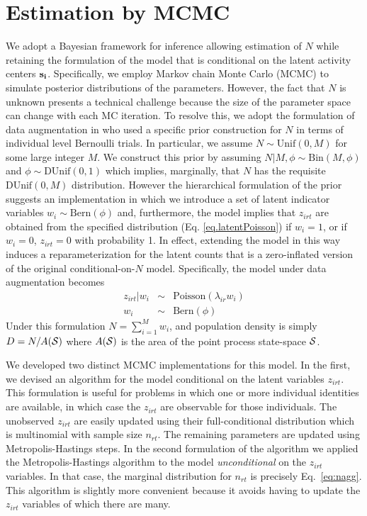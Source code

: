 \section{Estimation by MCMC}
\label{s:mcmc}

We adopt a Bayesian framework for inference allowing estimation of $N$
while retaining the formulation of the model that is conditional on
the latent activity centers $\bf s_i$.
Specifically, we employ Markov chain Monte Carlo
(MCMC) to simulate posterior distributions of the parameters. However,
the fact that $N$ is unknown presents a
technical challenge because the size of the parameter space can change
with each MC iteration. To resolve this, we
adopt the formulation of data augmentation in \citet{royle_etal:2007} who
used a specific prior construction for $N$ in terms of individual level
Bernoulli trials. In particular, we assume $N \sim \mbox{Unif}(0,M)$
for some large integer $M$. We construct this prior by assuming
$N|M,\phi \sim \mbox{Bin}(M,\phi)$ and $\phi \sim \mbox{DUnif}(0,1)$
which implies, marginally, that $N$ has the requisite
$\mbox{DUnif}(0,M)$ distribution. However
the hierarchical formulation of the prior suggests an implementation
in which we introduce a set of latent indicator variables $w_{i} \sim
\mbox{Bern}(\phi)$ and, furthermore, the model implies
that $z_{irt}$ are obtained
from the specified distribution (Eq. \ref{eq.latentPoisson})
if $w_{i} = 1$, or if
$w_{i}=0$, %
$z_{irt} =0$ with probability 1. In
effect, extending the model in this way induces a reparameterization
for the latent counts %
that is a zero-inflated version
of the original conditional-on-$N$ model. Specifically, the model
under
data augmentation becomes
\begin{eqnarray*}
 z_{irt}|w_{i} &\sim & \mbox{Poisson}(\lambda_{ir} w_i) \\
 w_{i} & \sim & \mbox{Bern}(\phi)
\end{eqnarray*}
Under this formulation $N = \sum_{i=1}^{M} w_i$, and population
density is simply $D = N/A({\cal S})$ where $A({\cal S})$ is the area of the
point process state-space ${\cal S}$.

We developed two distinct MCMC implementations for this model. In the
first, we devised an algorithm for the model conditional on the latent
variables $z_{irt}$. This formulation is useful for problems in which
one or more individual identities are available, in which case the
$z_{irt}$ are observable for those individuals. The unobserved
$z_{irt}$ are easily updated using their full-conditional
distribution which is multinomial with sample size $n_{rt}$. The
remaining parameters are updated using Metropolis-Hastings steps.  In the second formulation of the algorithm we applied
the Metropolis-Hastings algorithm to the model {\it unconditional} on
the $z_{irt}$ variables. In that case, the marginal distribution for
$n_{rt}$ is precisely Eq.~\ref{eq:nagg}.  This algorithm is slightly more
convenient because
it avoids having to update the $z_{irt}$ variables of which there are many.




